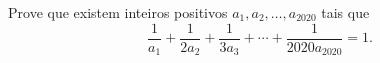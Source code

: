 Prove que existem inteiros positivos $a_1, a_2, \dots, a_{2020}$ tais que  \[
	\frac{1}{a_1} + \frac{1}{2a_2} + \frac{1}{3a_3} + \cdots + \frac{1}{2020a_{2020}} = 1.
\]
